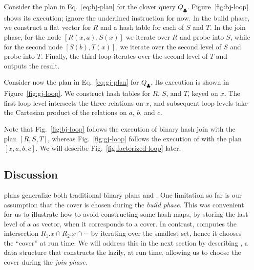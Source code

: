 \begin{example}\label{ex:binary-free-join}
  Consider the plan in Eq.~\eqref{eq:bj-plan} for the clover query $Q_\clubsuit$.
  Figure~\ref{fig:bj-loop} shows its execution; ignore the underlined
  instruction for now.
  In the build phase,
  we construct a flat vector for $R$ and a hash table for each of $S$ and $T$.
  In the join phase, for the  node $[R(x, a), S(x)]$  we
  iterate over $R$ and probe into $S$, while for the second node $[S(b), T(x)]$,
  we iterate over the second level of $S$ and probe into $T$.
  Finally, the third loop iterates over the second level of $T$ and outputs the result.
\end{example}

\begin{example}\label{ex:generic-free-join}
  Consider now the plan in Eq.~\eqref{eq:gj-plan} for  $Q_\clubsuit$.
  Its execution is shown in Figure~\ref{fig:gj-loop}.
  We construct  hash tables for $R$, $S$, and $T$, keyed on $x$.
  The first loop level intersects the three relations on $x$,
  and subsequent loop levels take the Cartesian product of the relations on $a$, $b$, and $c$.
\end{example}

Note that Fig.~\ref{fig:bj-loop}
follows the execution of binary hash join with the plan $[R, S, T]$,
whereas Fig.~\ref{fig:gj-loop} follows the execution of \GJ
with the plan $[x, a, b, c]$.  We will describe
Fig.~\ref{fig:factorized-loop} later.

\subsection{Discussion}

\FJ plans generalize both traditional binary plans and \GJ.
One
limitation so far is our assumption that the cover is chosen during
the {\em build phase}.  This was convenient for us to illustrate how
to avoid constructing some hash maps, by storing the last level of a
\GHT as vector, when it corresponds to a cover.  In contrast, \GJ
computes the intersection $R_1.x\cap R_2.x\cap \cdots$ by iterating
over the smallest set, hence it chooses the ``cover'' at run time.  We
will address this in the next section by describing \COLT, a data
structure that constructs the \GHT lazily, at run time, allowing us to
choose the cover during the {\em join phase}.
